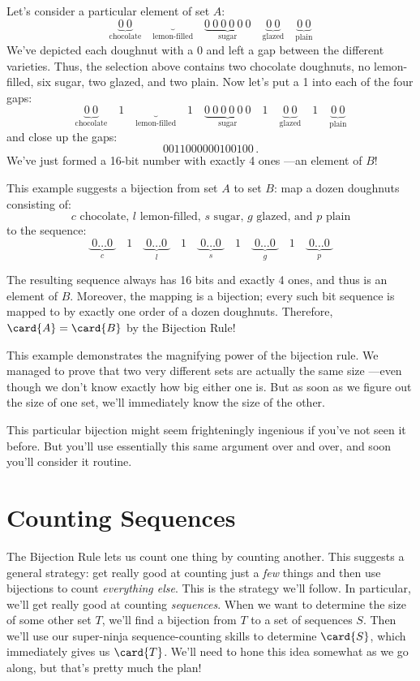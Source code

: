Let's consider a particular element of set $A$:
%
\[
\underbrace{0\ 0}_{\text{chocolate}} \quad
\underbrace{}_{\text{lemon-filled}} \quad
\underbrace{0\ 0\ 0\ 0\ 0\ 0}_{\text{sugar}} \quad
\underbrace{0\ 0}_{\text{glazed}} \quad
\underbrace{0\ 0}_{\text{plain}}
\]
%
We've depicted each doughnut with a $0$ and left a gap between the
different varieties.  Thus, the selection above contains two chocolate
doughnuts, no lemon-filled, six sugar, two glazed, and two plain.  Now
let's put a 1 into each of the four gaps:
%
\[
\underbrace{0\ 0}_{\text{chocolate}} \quad 1 \quad
\underbrace{}_{\text{lemon-filled}} \quad 1 \quad
\underbrace{0\ 0\ 0\ 0\ 0\ 0}_{\text{sugar}} \quad 1 \quad
\underbrace{0\ 0}_{\text{glazed}} \quad 1 \quad
\underbrace{0\ 0}_{\text{plain}}
\]
and close up the gaps:
\[
0011000000100100 \,.
\]
We've just formed a 16-bit number with exactly 4 ones ---an element of
$B$!

This example suggests a bijection from set $A$ to set $B$: map a dozen
doughnuts consisting of:
%
\[
\text{$c$ chocolate, $l$ lemon-filled, $s$ sugar, $g$ glazed, and $p$ plain}
\]
%
to the sequence:
%
\[
\underbrace{\ 0 \ldots 0\ }_{\text{$c$}} \quad 1 \quad
\underbrace{\ 0 \ldots 0\ }_{\text{$l$}} \quad 1 \quad
\underbrace{\ 0 \ldots 0\ }_{\text{$s$}} \quad 1 \quad
\underbrace{\ 0 \ldots 0\ }_{\text{$g$}} \quad 1 \quad
\underbrace{\ 0 \ldots 0\ }_{\text{$p$}}
\]

The resulting sequence always has 16 bits and exactly 4
ones, and thus is an element of $B$.  Moreover, the mapping is a
bijection; every such bit sequence is mapped to by exactly one order
of a dozen doughnuts.  Therefore, $\card{A} = \card{B}$ by the
Bijection Rule!

This example demonstrates the magnifying power of the bijection rule.
We managed to prove that two very different sets are actually the same
size ---even though we don't know exactly how big either one is.  But
as soon as we figure out the size of one set, we'll immediately know
the size of the other.

This particular bijection might seem frighteningly ingenious if you've
not seen it before.  But you'll use essentially this same argument
over and over, and soon you'll consider it routine.

\section{Counting Sequences}\label{sec:counting_sequences}

The Bijection Rule lets us count one thing by counting another.  This
suggests a general strategy: get really good at counting just a
\emph{few} things and then use bijections to count
\emph{everything else}.  This is the strategy we'll follow.  In
particular, we'll get really good at counting \emph{sequences}.  When
we want to determine the size of some other set $T$, we'll find a
bijection from $T$ to a set of sequences $S$.  Then we'll use our
super-ninja sequence-counting skills to determine $\card{S}$, which
immediately gives us $\card{T}$.  We'll need to hone this idea
somewhat as we go along, but that's pretty much the plan!

